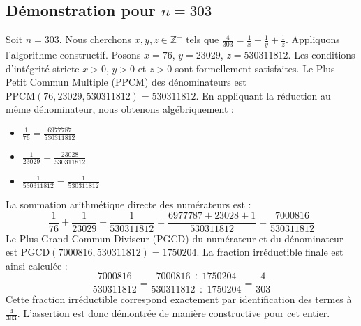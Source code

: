 \documentclass[11pt,a4paper]{article}
\begin{document}
\subsection{Démonstration pour $n = 303$}
Soit $n = 303$. Nous cherchons $x, y, z \in \mathbb{Z}^{+}$ tels que $\frac{4}{303} = \frac{1}{x} + \frac{1}{y} + \frac{1}{z}$.
Appliquons l'algorithme constructif. Posons $x = 76$, $y = 23029$, $z = 530311812$.
Les conditions d'intégrité stricte $x > 0$, $y > 0$ et $z > 0$ sont formellement satisfaites.
Le Plus Petit Commun Multiple (PPCM) des dénominateurs est $\text{PPCM}(76, 23029, 530311812) = 530311812$.
En appliquant la réduction au même dénominateur, nous obtenons algébriquement :
\begin{itemize}
    \item $\frac{1}{76} = \frac{6977787}{530311812}$
    \item $\frac{1}{23029} = \frac{23028}{530311812}$
    \item $\frac{1}{530311812} = \frac{1}{530311812}$
\end{itemize}
La sommation arithmétique directe des numérateurs est :
$$ \frac{1}{76} + \frac{1}{23029} + \frac{1}{530311812} = \frac{6977787 + 23028 + 1}{530311812} = \frac{7000816}{530311812} $$
Le Plus Grand Commun Diviseur (PGCD) du numérateur et du dénominateur est $\text{PGCD}(7000816, 530311812) = 1750204$.
La fraction irréductible finale est ainsi calculée :
$$ \frac{7000816}{530311812} = \frac{7000816 \div 1750204}{530311812 \div 1750204} = \frac{4}{303} $$
Cette fraction irréductible correspond exactement par identification des termes à $\frac{4}{303}$. L'assertion est donc démontrée de manière constructive pour cet entier.
\end{document}

